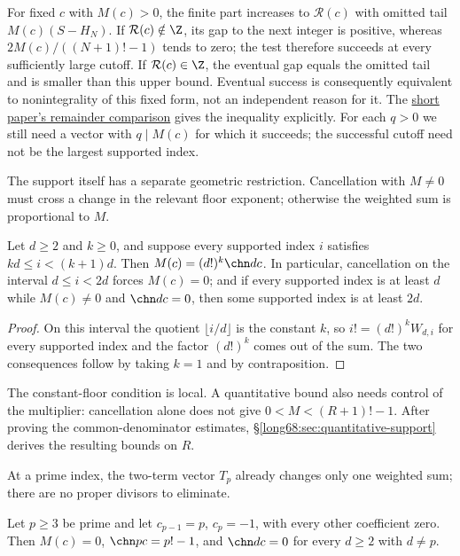 For fixed $c$ with $M(c)>0$, the finite part increases to
$\mathcal R(c)$ with omitted tail $M(c)(S-H_N)$. If
$\mathcal R(c)\notin\Z$, its gap to the next integer is positive,
whereas $2M(c)/((N+1)!-1)$ tends to zero; the test therefore succeeds
at every sufficiently large cutoff. If $\mathcal R(c)\in\Z$, the
eventual gap equals the omitted tail and is smaller than this upper
bound. Eventual success is consequently equivalent to nonintegrality
of this fixed form, not an independent reason for it. The
\href{erdos-68-factorial-denominator-irrationality.pdf\#r12-short-gap}{short paper's remainder comparison}
gives the inequality explicitly. For each $q>0$ we still need a vector
with $q\mid M(c)$ for which it succeeds; the successful cutoff need
not be the largest supported index.

The support itself has a separate geometric restriction. Cancellation
with $M\ne0$ must cross a change in the relevant floor exponent;
otherwise the weighted sum is proportional to $M$.

\begin{theorem}\label{long68:res:bandbreakpoint}
Let $d\ge2$ and $k\ge0$, and suppose every supported index $i$ satisfies
$kd\le i<(k+1)d$.  Then $M(c)=(d!)^k\chn dc$.  In particular, cancellation
on the interval $d\le i<2d$ forces $M(c)=0$; and if every supported index
is at least $d$ while $M(c)\ne0$ and $\chn dc=0$, then some supported index
is at least $2d$.
\end{theorem}

\begin{proof}
On this interval the quotient $\lfloor i/d\rfloor$ is the constant $k$, so
$i!=(d!)^kW_{d,i}$ for every supported index and the factor $(d!)^k$ comes
out of the sum.  The two consequences follow by taking $k=1$ and by
contraposition.
\end{proof}

The constant-floor condition is local. A quantitative bound also needs
control of the multiplier: cancellation alone does not give
$0<M<(R+1)!-1$. After proving the common-denominator estimates,
\S\ref{long68:sec:quantitative-support} derives the resulting bounds on $R$.

At a prime index, the two-term vector $T_p$ already changes only one
weighted sum; there are no proper divisors to eliminate.

\begin{theorem}\label{long68:res:translator}
Let $p\ge3$ be prime and let $c_{p-1}=p$, $c_p=-1$, with every other coefficient
zero.  Then $M(c)=0$, $\chn pc=p!-1$, and $\chn dc=0$ for every $d\ge2$ with
$d\ne p$.
\end{theorem}

